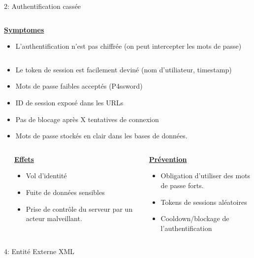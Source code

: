 \documentclass[final,hyperref={pdfpagelabels=false}]{beamer}
\begin{document}
\begin{frame}[t]
\begin{columns}[t]
\begin{column}{.465\textwidth}
\begin{block}{2: Authentification cassée}
\begin{columns}[T]
			\begin{column}{.875\textwidth}
				\uline{\uline{\textbf{Symptomes}}}
				\begin{itemize}
					\item L'authentification n'est pas chiffrée (on peut intercepter les mots de passe)
				\end{itemize}
			\end{column}
		\end{columns}
		\begin{itemize}
			\item Le token de session est facilement deviné (nom d'utiliateur, timestamp)
			\item Mots de passe faibles acceptés (P4ssword)
			\item ID de session exposé dans les URLs
			\item Pas de blocage après X tentatives de connexion
			\item Mots de passe stockés en clair dans les bases de données.
		\end{itemize}
		\begin{columns}[T]
			\begin{column}{.01\textwidth}
			\end{column}
			\begin{column}{0.495\textwidth}
				\vfill
				\uline{\textbf{Effets}}
				\begin{itemize}
					\item Vol d'identité
					\item Fuite de données sensibles
					\item Prise de contrôle du serveur par un acteur malveillant.
				\end{itemize}
				\vfill
			\end{column}
			\begin{column}{0.495\textwidth}
				\vfill
				\uline{\textbf{Prévention}}
				\begin{itemize}
					\item Obligation d'utiliser des mots de passe forts.
					\item Tokens de sessions aléatoires
					\item Cooldown/blockage de l'authentification
				\end{itemize}
			\end{column}
		\end{columns}


	\end{block}

	\begin{block}{4: Entité Externe XML}
		\begin{columns}[T]


\end{columns}
\end{block}
\end{column}
\end{columns}
\end{frame}
\end{document}
